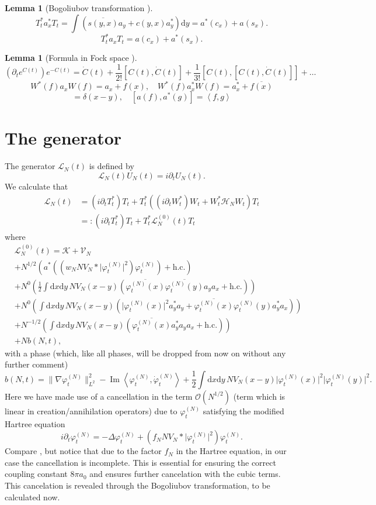 \documentclass[11pt,a4paper,twoside,headsepline]{scrartcl}
\newtheorem{lem}[thm]{Lemma}
\newcommand{\di}{\textrm{d}}		%
\newcommand{\Lcal}{\mathcal{L}}		%
\newcommand{\Kcal}{\mathcal{K}}		%
\newcommand{\Vcal}{\mathcal{V}}		%
\newcommand{\Hcal}{\mathcal{H}}		%
\newcommand{\Ocal}{\mathcal{O}}		%
\newcommand{\hc}{\mbox{h.c.}}		%
\newcommand{\scal}[2]{\left<#1,#2\right>} %
\newcommand{\cc}[1]{\overline{#1}}	%
\renewcommand{\Im}{\operatorname{Im}} 	%
\newcommand{\norm}[1]{\lVert#1\rVert}	%
\newcommand{\ph}{\varphi_t^{(N)}}	%
\newcommand{\phdot}{\dot{\varphi}_t^{(N)}}	%
\newcommand{\bd}{\begin{displaymath}}			%
\newcommand{\ed}{\end{displaymath}}
\begin{document}
\begin{lem}[Bogoliubov transformation \cite{GMM2010}]
\label{lem:bogoliubovtransformation}
 \bd
 T_t^* a^*_x T_t = \int \left( \cc{s(y,x)} a_y + c(y,x) a^*_y \right) \di y = a^*(c_x) + a(s_x).
 \ed
\bd
 T_t^* a_x T_t = a(c_x) + a^*(s_x).
\ed
\end{lem}

\begin{lem}[Formula in Fock space \cite{RS2009}]
 \bd
\left(\partial_t e^{C(t)} \right) e^{-C(t)} = \dot C(t) + \frac{1}{2!}[C(t),\dot C(t)]+ \frac{1}{3!}[C(t),[C(t),\dot C(t)]] + \dots
 \ed
\bd
 W^*(f) a_x W(f) = a_x + f(x), \quad W^*(f)a^*_x W(f) = a^*_x + \cc{f(x)}
\ed
\bd
[a_x,a^*_y] = \delta(x-y), \quad [a(f),a^*(g)] = \scal{f}{g}
\ed
\end{lem}

\section{The generator}
The generator $\Lcal_N(t)$ is defined by
\bd
\Lcal_N(t) U_N(t) = i \partial_t U_N(t).
\ed
We calculate that
\begin{align*}
\Lcal_N(t) 	& = (i \partial_t T^*_t) T_t + T^*_t \left( (i \partial_t W^*_t) W_t + W^*_t \Hcal_N W_t \right) T_t \\
		& =: (i \partial_t T^*_t) T_t + T^*_t \Lcal^{(0)}_N(t) T_t
\end{align*}
where
\begin{align*}
& \Lcal^{(0)}_N(t) = \Kcal + \Vcal_N \\
		& + N^{1/2} \left(  a^*\left( (w_N N V_N \ast \lvert \ph \rvert^2)\ph \right) + \hc  \right) \\
		& + N^0	    \left(  \frac{1}{2}\int \di x \di y\, NV_N(x-y)\left( \cc{\ph(x)} \cc{\ph(y)} a_y a_x + \hc \right) \right) \\
		& + N^0	    \left(  \int \di x \di y\, NV_N(x-y)\left( \lvert \ph(x) \rvert^2 a^*_y a_y + \cc{\ph(x)} \ph(y) a^*_y a_x \right) \right) \\
		& + N^{-1/2}\left(  \int \di x \di y\, NV_N(x-y) \left( \cc{\ph(x)} a^*_y a_y a_x + \hc \right)  \right) \\
		& + N b(N,t),
\end{align*}
with a phase (which, like all phases, will be dropped from now on without any further comment)
\bd
b(N,t) = \norm{\nabla \ph}_{L^2}^2 - \Im \scal{\ph}{\phdot} + \frac{1}{2}\int \di x \di y\, NV_N(x-y) \lvert \ph(x)\rvert^2 \lvert \ph(y) \rvert^2.
\ed
Here we have made use of a cancellation in the term $\Ocal({N^{1/2}})$ (term which is linear in creation/annihilation operators) due to $\ph$ satisfying the modified Hartree equation
\bd
i\partial_t \ph = -\Delta \ph + \left(f_N N V_N \ast \lvert \ph \rvert^2 \right) \ph.
\ed
Compare \cite{RS2009}, but notice that due to the factor $f_N$ in the Hartree equation, in our case the cancellation is incomplete. This is essential for ensuring the correct coupling constant $8\pi a_0$ and ensures further cancelation with the cubic terms. This cancelation is revealed through the Bogoliubov transformation, to be calculated now.
\end{document}
